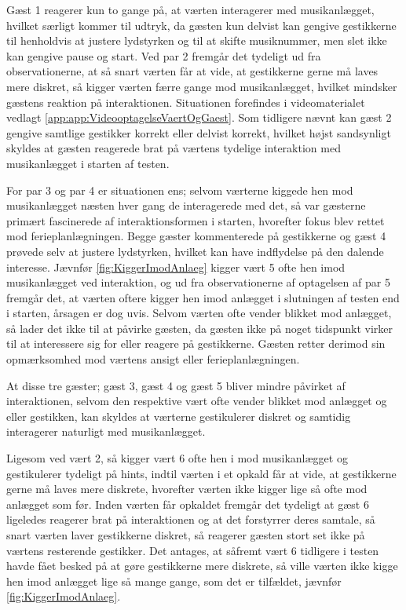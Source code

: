 Gæst 1 reagerer kun to gange på, at værten interagerer med musikanlægget, hvilket særligt kommer til udtryk, da gæsten kun delvist kan gengive gestikkerne til henholdvis at justere lydstyrken og til at skifte musiknummer, men slet ikke kan gengive pause og start. Ved par 2 fremgår det tydeligt ud fra observationerne, at så snart værten får at vide, at gestikkerne gerne må laves mere diskret, så kigger værten færre gange mod musikanlægget, hvilket mindsker gæstens reaktion på interaktionen. Situationen forefindes i videomaterialet vedlagt \autoref{app:app:VideooptagelseVaertOgGaest}. Som tidligere nævnt kan gæst 2 gengive samtlige gestikker korrekt eller delvist korrekt, hvilket højst sandsynligt skyldes at gæsten reagerede brat på værtens tydelige interaktion med musikanlægget i starten af testen. 

For par 3 og par 4 er situationen ens; selvom værterne kiggede hen mod musikanlægget næsten hver gang de interagerede med det, så var gæsterne primært fascinerede af interaktionsformen i starten, hvorefter fokus blev rettet mod ferieplanlægningen. Begge gæster kommenterede på gestikkerne og gæst 4 prøvede selv at justere lydstyrken, hvilket kan have indflydelse på den dalende interesse. Jævnfør \autoref{fig:KiggerImodAnlaeg} kigger vært 5 ofte hen imod musikanlægget ved interaktion, og ud fra observationerne af optagelsen af par 5 fremgår det, at værten oftere kigger hen imod anlægget i slutningen af testen end i starten, årsagen er dog uvis. Selvom værten ofte vender blikket mod anlægget, så lader det ikke til at påvirke gæsten, da gæsten ikke på noget tidspunkt virker til at interessere sig for eller reagere på gestikkerne. Gæsten retter derimod sin opmærksomhed mod værtens ansigt eller ferieplanlægningen. 

At disse tre gæster; gæst 3, gæst 4 og gæst 5 bliver mindre påvirket af interaktionen, selvom den respektive vært ofte vender blikket mod anlægget og eller gestikken, kan skyldes at værterne gestikulerer diskret og samtidig interagerer naturligt med musikanlægget.

Ligesom ved vært 2, så kigger vært 6 ofte hen i mod musikanlægget og gestikulerer tydeligt på hints, indtil værten i et opkald får at vide, at gestikkerne gerne må laves mere diskrete, hvorefter værten ikke kigger lige så ofte mod anlægget som før. Inden værten får opkaldet fremgår det tydeligt at gæst 6 ligeledes reagerer brat på interaktionen og at det forstyrrer deres samtale, så snart værten laver gestikkerne diskret, så reagerer gæsten stort set ikke på værtens resterende gestikker. Det antages, at såfremt vært 6 tidligere i testen havde fået besked på at gøre gestikkerne mere diskrete, så ville værten ikke kigge hen imod anlægget lige så mange gange, som det er tilfældet, jævnfør \autoref{fig:KiggerImodAnlaeg}. 


